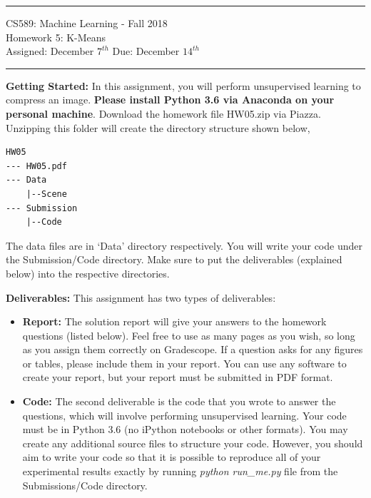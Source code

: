 \documentclass[11pt]{article}
\begin{document}
{\centering
  \rule{6.3in}{2pt}
  \vspace{1em}
  {\Large
    CS589: Machine Learning - Fall 2018\\
    Homework 5: K-Means\\
  }
  \vspace{1em}
  Assigned: December $7^{th}$ Due: December $14^{th}$\\
  \vspace{0.1em}
  \rule{6.3in}{1.5pt}
}
\vspace{1pc}

\textbf{Getting Started:} In this assignment, you will perform unsupervised learning to compress an image. \textbf{Please install Python 3.6 via Anaconda on your personal machine}. Download the homework file HW05.zip via Piazza. Unzipping this folder will create the directory structure shown below,
\begin{verbatim}
HW05
--- HW05.pdf
--- Data
    |--Scene
--- Submission
    |--Code
\end{verbatim}
The data files are in `Data' directory respectively. You will write your code under the Submission/Code directory. Make sure to put the deliverables (explained below) into the respective directories.

\vspace{5mm}
\textbf{Deliverables:} This assignment has two types of deliverables:
\begin{itemize}
\item \textbf{Report:} The solution report will give your answers to the homework questions (listed below). Feel free to use as many pages as you wish, so long as you assign them correctly on Gradescope.  If a question asks for any figures or tables, please include them in your report. You can use any software to create your report, but your report must be submitted in PDF format.

\item \textbf{Code:} The second deliverable is the code that you wrote to answer the questions, which will involve performing unsupervised learning. Your code must be in Python 3.6 (no iPython notebooks or other formats). You may create any additional source files to structure your code. However, you should aim to write your code so that it is possible to reproduce all of your experimental results exactly by running \textit{python run\_me.py} file from the Submissions/Code directory.

\end{itemize}
\vspace{1em}
\end{document}

